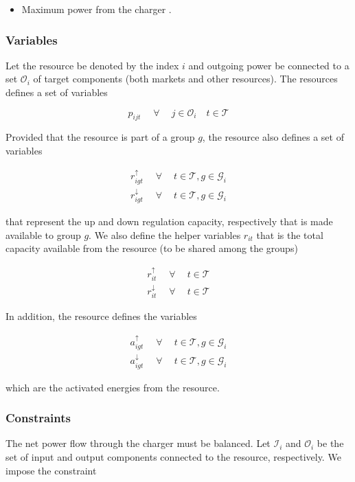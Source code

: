 \documentclass[]{report}
\newcommand{\groups}{\mathcal{G}}
\newcommand{\timesteps}{\mathcal{T}}
\newcommand{\outputs}{\mathcal{O}}
\newcommand{\inputs}{\mathcal{I}}
\newcommand{\pmax}{\overline{P}}
\let\oldforall\forall
\renewcommand{\forall}{\; \oldforall \: }
\begin{document}
\begin{itemize}
    \item [$\pmax_i$] Maximum power from the charger .
\end{itemize}

\subsubsection*{Variables}
Let the resource be denoted by the index $i$ and outgoing power be connected to a set $\outputs_i$ of target components (both markets and other resources). The resources defines a set of variables 

\begin{equation}
    p_{ijt} \quad \forall \quad j \in \outputs_i \quad t \in \timesteps
\end{equation}

Provided that the resource is part of a group $g$, the resource also defines a set of variables 

\begin{align}
    r^{\uparrow}_{igt} \quad \forall \quad t \in \timesteps, g \in \groups_i \\
    r^{\downarrow}_{igt} \quad \forall \quad t \in \timesteps, g \in \groups_i
\end{align}

that represent the up and down regulation capacity, respectively that is made available to group $g$. We also define the helper variables $r_{it}$ that is the total capacity available from the resource (to be shared among the groups)

\begin{align}
    r^{\uparrow}_{it} \quad \forall \quad t \in \timesteps \\
    r^{\downarrow}_{it} \quad \forall \quad t \in \timesteps
\end{align}

In addition, the resource defines the variables

\begin{align}
    a^{\uparrow}_{igt} \quad \forall \quad t \in \timesteps, g \in \groups_i \\
    a^{\downarrow}_{igt} \quad \forall \quad t \in \timesteps, g \in \groups_i
\end{align}

which are the activated energies from the resource.

\subsubsection*{Constraints}
The net power flow through the charger must be balanced. Let $\inputs_i$ 
and $\outputs_i$ be the set of input and output components connected to the resource, respectively. We impose the constraint
\end{document}
